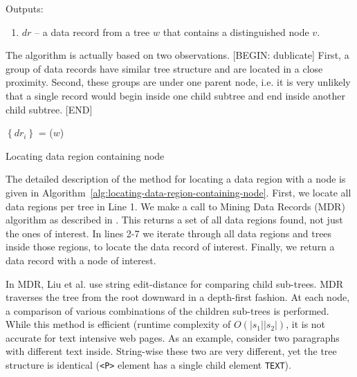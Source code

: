 Outputs: 

\begin{enumerate}
	\item $dr$ -- a data record from a tree $w$ that contains a distinguished node $v$.
\end{enumerate}

The algorithm is actually based on two observations. [BEGIN: dublicate] First, a group of data records have similar tree structure and are located in a close proximity. Second, these groups are under one parent node, i.e. it is very unlikely that a single record would begin inside one child subtree and end inside another child subtree. [END]


\IncMargin{2em}
\begin{algorithm}[h]

	\DontPrintSemicolon

	\BlankLine

	$\left\{dr_i\right\}$ = \MDR($w$) \;
	 {
		 {
		}
	}

	\caption{Locating data region containing node}
	\label{alg:locating-data-region-containing-node}

\end{algorithm}
\DecMargin{2em}

The detailed description of the method for locating a data region with a node is given in Algorithm~\ref{alg:locating-data-region-containing-node}. First, we locate all data regions per tree in Line 1. We make a call to Mining Data Records (MDR) algorithm as described in \cite{liu2009a}. This returns a set of all data regions found, not just the ones of interest. In lines 2-7 we iterate through all data regions and trees inside those regions, to locate the data record of interest. Finally, we return a data record with a node of interest.

In MDR, Liu et al. \cite{liu2009a} use string edit-distance for comparing child sub-trees. MDR traverses the tree from the root downward in a depth-first fashion. At each node, a  comparison of various combinations of the children sub-trees is performed. While this method is efficient (runtime complexity of $O(|s_1||s_2|)$, it is not accurate for text intensive web pages. As an example, consider two paragraphs with different text inside. String-wise these two are very different, yet the tree structure is identical (\texttt{<P>} element has a single child element \texttt{TEXT}).


